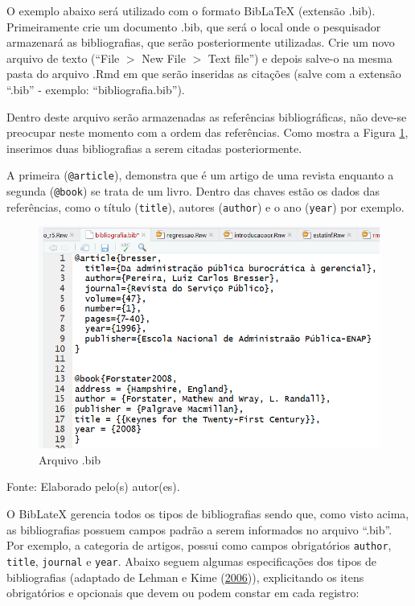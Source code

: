 \documentclass[12pt,brazil,oneside]{book}
\begin{document}
O exemplo abaixo será utilizado com o formato BibLaTeX (extensão .bib). Primeiramente crie um documento .bib, que será o local onde o pesquisador armazenará as bibliografias, que serão posteriormente utilizadas. Crie um novo arquivo de texto (``File \(>\) New File \(>\) Text file'') e depois salve-o na mesma pasta do arquivo .Rmd em que serão inseridas as citações (salve com a extensão ``.bib'' - exemplo: ``bibliografia.bib'').

Dentro deste arquivo serão armazenadas as referências bibliográficas, não deve-se preocupar neste momento com a ordem das referências. Como mostra a Figura \ref{fig:rmarkbib}, inserimos duas bibliografias a serem citadas posteriormente.

A primeira (\texttt{@article}), demonstra que é um artigo de uma revista enquanto a segunda (\texttt{@book}) se trata de um livro. Dentro das chaves estão os dados das referências, como o título (\texttt{title}), autores (\texttt{author}) e o ano (\texttt{year}) por exemplo.

\begin{figure}[H]

{\centering \includegraphics[width=0.7\linewidth]{rmarkbib} 

}

\caption{Arquivo .bib}\label{fig:rmarkbib}
\end{figure}

Fonte: Elaborado pelo(s) autor(es).

O BibLateX gerencia todos os tipos de bibliografias sendo que, como visto acima, as bibliografias possuem campos padrão a serem informados no arquivo ``.bib''. Por exemplo, a categoria de artigos, possui como campos obrigatórios \texttt{author}, \texttt{title}, \texttt{journal} e \texttt{year}. Abaixo seguem algumas especificações dos tipos de bibliografias (adaptado de Lehman e Kime (\protect\hyperlink{ref-biblatex}{2006})), explicitando os itens obrigatórios e opcionais que devem ou podem constar em cada registro:
\end{document}
